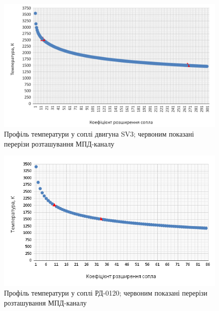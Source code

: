\begin{figure}
	\centering
	\includegraphics[width=0.7\textheight, angle=0,origin=c]{chapter_3/SV3_T(epsilon).png}
	\caption{Профіль температури у соплі двигуна SV3; червоним показані перерізи розташування МПД-каналу}
	\label{fig:SV3_T(epsilon)}
\end{figure}

\begin{figure}
	\centering
	\includegraphics[width=0.7\textheight, angle=0,origin=c]{chapter_3/RD-0120_T(epsilon).png}
	\caption{Профіль температури у соплі РД-0120; червоним показані перерізи розташування МПД-каналу}
	\label{fig:RD-0120_T(epsilon)}
\end{figure}


